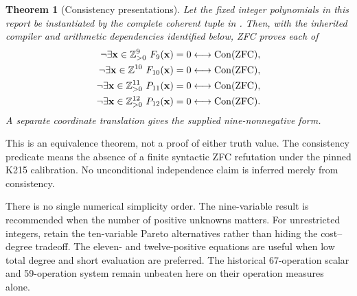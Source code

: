 \documentclass[11pt]{article}
\newtheorem{theorem}{Theorem}[section]
\newcommand{\Pos}{\mathbb Z_{>0}}\newcommand{\Con}{\operatorname{Con}}
\begin{document}
\begin{theorem}[Consistency presentations]
Let the fixed integer polynomials in this report be instantiated by the
complete coherent tuple in .
Then, with the inherited compiler and arithmetic dependencies identified
below, ZFC proves each of
\[
\begin{aligned}
\neg\exists\mathbf x\in\Pos^9\ F_9(\mathbf x)=0
 &\longleftrightarrow\Con(\mathrm{ZFC}),\\
\neg\exists\mathbf x\in\Z^{10}\ F_{10}(\mathbf x)=0
 &\longleftrightarrow\Con(\mathrm{ZFC}),\\
\neg\exists\mathbf x\in\Pos^{11}\ P_{11}(\mathbf x)=0
 &\longleftrightarrow\Con(\mathrm{ZFC}),\\
\neg\exists\mathbf x\in\Pos^{12}\ P_{12}(\mathbf x)=0
 &\longleftrightarrow\Con(\mathrm{ZFC}).
\end{aligned}
\]
A separate coordinate translation gives the supplied nine-nonnegative form.
\end{theorem}
This is an equivalence theorem, not a proof of either truth value. The
consistency predicate means the absence of a finite syntactic ZFC refutation
under the pinned K215 calibration. No unconditional independence claim is
inferred merely from consistency.



There is no single numerical simplicity order. The nine-variable result is
recommended when the number of positive unknowns matters. For unrestricted
integers, retain the ten-variable Pareto alternatives rather than hiding the
cost--degree tradeoff. The eleven- and twelve-positive equations are useful
when low total degree and short evaluation are preferred. The historical
67-operation scalar and 59-operation system remain unbeaten here on their
operation measures alone.
\end{document}
